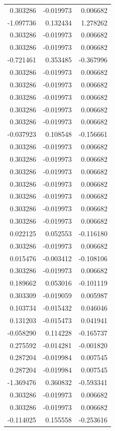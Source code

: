 \documentclass[a4paper,twoside,12pt]{book}
\begin{document}
\begin{appendices}
\begin{table}
\begin{tabular}{rrr}
	 0.303286 & -0.019973 &  0.006682 \\
	-1.097736 &  0.132434 &  1.278262 \\
	 0.303286 & -0.019973 &  0.006682 \\
	 0.303286 & -0.019973 &  0.006682 \\
	-0.721461 &  0.353485 & -0.367996 \\
	 0.303286 & -0.019973 &  0.006682 \\
	 0.303286 & -0.019973 &  0.006682 \\
	 0.303286 & -0.019973 &  0.006682 \\
	 0.303286 & -0.019973 &  0.006682 \\
	 0.303286 & -0.019973 &  0.006682 \\
	-0.037923 &  0.108548 & -0.156661 \\
	 0.303286 & -0.019973 &  0.006682 \\
	 0.303286 & -0.019973 &  0.006682 \\
	 0.303286 & -0.019973 &  0.006682 \\
	 0.303286 & -0.019973 &  0.006682 \\
	 0.303286 & -0.019973 &  0.006682 \\
	 0.303286 & -0.019973 &  0.006682 \\
	 0.303286 & -0.019973 &  0.006682 \\
	 0.022125 &  0.052553 & -0.116180 \\
	 0.303286 & -0.019973 &  0.006682 \\
	 0.015476 & -0.003412 & -0.108106 \\
	 0.303286 & -0.019973 &  0.006682 \\
	 0.189662 &  0.053016 & -0.101119 \\
	 0.303309 & -0.019059 &  0.005987 \\
	 0.103734 & -0.015432 &  0.046046 \\
	 0.131203 & -0.015473 &  0.041941 \\
	-0.058290 &  0.114228 & -0.165737 \\
	 0.275592 & -0.014281 & -0.001820 \\
	 0.287204 & -0.019984 &  0.007545 \\
	 0.287204 & -0.019984 &  0.007545 \\
	-1.369476 &  0.360832 & -0.593341 \\
	 0.303286 & -0.019973 &  0.006682 \\
	 0.303286 & -0.019973 &  0.006682 \\
	-0.114025 &  0.155558 & -0.253616 \\

\end{tabular}
\end{table}
\end{appendices}
\end{document}
